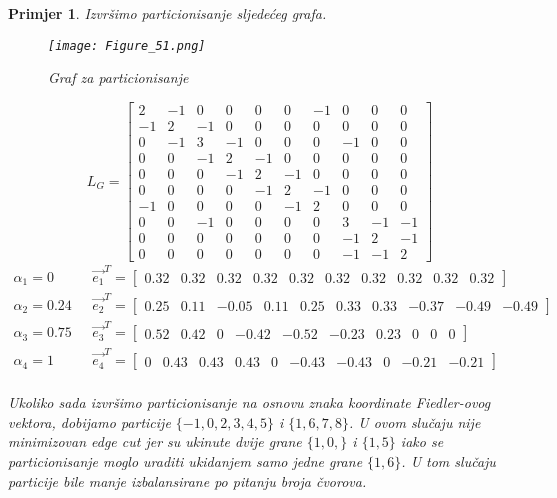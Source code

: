 \documentclass[11pt]{article}
\newtheorem{example}{Primjer}
\begin{document}
		\begin{example}
			Izvršimo particionisanje sljedećeg grafa.
			\begin{figure}[h]
				\centering
				\texttt{[image: Figure\_51.png]}
				\caption{Graf za particionisanje}
			\end{figure}
			
			\[ 
				L_G =
				\begin{bmatrix}
					2 &-1 & 0 & 0 & 0 & 0 &-1 & 0 & 0 & 0 \\
					-1 & 2 &-1 & 0 & 0 & 0 & 0 & 0 & 0 & 0 \\
					0 &-1 & 3 &-1 & 0 & 0 & 0 &-1 & 0 & 0 \\
					0 & 0 &-1 & 2 &-1 & 0 & 0 & 0 & 0 & 0 \\
					0 & 0 & 0 &-1 & 2 &-1 & 0 & 0 & 0 & 0 \\
					0 & 0 & 0 & 0 &-1 & 2 &-1 & 0 & 0 & 0 \\
					-1 & 0 & 0 & 0 & 0 &-1 & 2 & 0 & 0 & 0 \\
					0 & 0 &-1 & 0 & 0 & 0 & 0 & 3 &-1 &-1 \\
					0 & 0 & 0 & 0 & 0 & 0 & 0 &-1 & 2 &-1 \\
					0 & 0 & 0 & 0 & 0 & 0 & 0 &-1 &-1 & 2
				\end{bmatrix}
				\]
				\[
					\begin{split}
						\alpha_1=0 \texttt{~~~~} & \vec{e_1}^T = \begin{bmatrix} 0.32& 0.32& 0.32& 0.32& 0.32& 0.32& 0.32& 0.32& 0.32& 0.32      \end{bmatrix} \\ 
						\alpha_2=0.24 \texttt{~~} & \vec{e_2}^T = \begin{bmatrix} 0.25& 0.11& -0.05& 0.11& 0.25& 0.33& 0.33& -0.37& -0.49& -0.49  \end{bmatrix} \\ 
						\alpha_3=0.75 \texttt{~~} & \vec{e_3}^T = \begin{bmatrix} 0.52& 0.42& 0& -0.42& -0.52& -0.23& 0.23& 0& 0& 0                 \end{bmatrix} \\
						\alpha_4=1 \texttt{~~~~} & \vec{e_4}^T = \begin{bmatrix} 0& 0.43& 0.43& 0.43& 0& -0.43& -0.43& 0& -0.21& -0.21   \end{bmatrix} \\
					\end{split}
					\]

					Ukoliko sada izvršimo particionisanje na osnovu znaka koordinate Fiedler-ovog vektora, dobijamo particije $\{-1,0,2,3,4,5\}$ i $\{1,6,7,8\}$.
					U ovom slučaju nije minimizovan edge cut jer su ukinute dvije grane $\{1,0,\}$ i $\{1,5\}$ iako se particionisanje moglo uraditi ukidanjem samo jedne grane $\{1,6\}$. U tom slučaju particije bile manje izbalansirane po pitanju broja čvorova.
					

\end{example}
\end{document}
